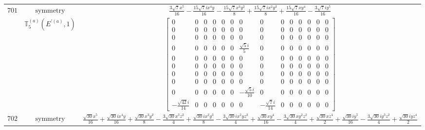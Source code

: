 \documentclass[fleqn,8pt,landscape]{jsarticle}
\begin{document}
\begin{longtable}{ccc}
$ 701 $ & $ \text{symmetry} $ & $ \frac{3 \sqrt{7} x^{5}}{16} - \frac{15 \sqrt{7} i x^{4} y}{16} - \frac{15 \sqrt{7} x^{3} y^{2}}{8} + \frac{15 \sqrt{7} i x^{2} y^{3}}{8} + \frac{15 \sqrt{7} x y^{4}}{16} - \frac{3 \sqrt{7} i y^{5}}{16} $ \\
$  $ & $ \mathbb{T}_{5}^{(a)}(E^{\prime(a)},1) $ & $ \begin{bmatrix} 0 & 0 & 0 & 0 & 0 & 0 & 0 & 0 & 0 & 0 & 0 & 0 & 0 & 0 \\ 0 & 0 & 0 & 0 & 0 & 0 & 0 & 0 & 0 & 0 & 0 & 0 & 0 & 0 \\ 0 & 0 & 0 & 0 & 0 & 0 & 0 & 0 & 0 & 0 & 0 & 0 & 0 & 0 \\ 0 & 0 & 0 & 0 & 0 & 0 & \frac{\sqrt{5} i}{5} & 0 & 0 & 0 & 0 & 0 & 0 & 0 \\ 0 & 0 & 0 & 0 & 0 & 0 & 0 & 0 & 0 & 0 & 0 & 0 & 0 & 0 \\ 0 & 0 & 0 & 0 & 0 & 0 & 0 & 0 & 0 & 0 & 0 & 0 & 0 & 0 \\ 0 & 0 & 0 & 0 & 0 & 0 & 0 & 0 & 0 & 0 & 0 & 0 & 0 & 0 \\ 0 & 0 & 0 & 0 & 0 & 0 & 0 & 0 & 0 & 0 & 0 & 0 & 0 & 0 \\ 0 & 0 & 0 & 0 & 0 & 0 & - \frac{\sqrt{5} i}{10} & 0 & 0 & 0 & 0 & 0 & 0 & 0 \\ - \frac{\sqrt{42} i}{14} & 0 & 0 & 0 & 0 & 0 & 0 & - \frac{\sqrt{7} i}{14} & 0 & 0 & 0 & 0 & 0 & 0 \end{bmatrix} $ \\ \hline
$ 702 $ & $ \text{symmetry} $ & $ \frac{\sqrt{30} x^{5}}{16} + \frac{\sqrt{30} i x^{4} y}{16} + \frac{\sqrt{30} x^{3} y^{2}}{8} - \frac{3 \sqrt{30} x^{3} z^{2}}{4} + \frac{\sqrt{30} i x^{2} y^{3}}{8} - \frac{3 \sqrt{30} i x^{2} y z^{2}}{4} + \frac{\sqrt{30} x y^{4}}{16} - \frac{3 \sqrt{30} x y^{2} z^{2}}{4} + \frac{\sqrt{30} x z^{4}}{2} + \frac{\sqrt{30} i y^{5}}{16} - \frac{3 \sqrt{30} i y^{3} z^{2}}{4} + \frac{\sqrt{30} i y z^{4}}{2} $ \\

\end{longtable}
\end{document}
